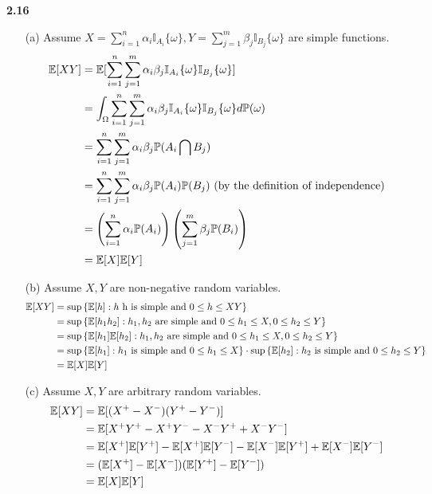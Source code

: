 \noindent\textbf{2.16}
\begin{enumerate}
\item[(a)] Assume $X=\sum^n_{i=1}\alpha_i\mathbb{I}_{A_i}\{\omega \},Y=\sum^m_{j=1}\beta_j\mathbb{I}_{B_j}\{\omega \}$ are simple functions.
    \begin{align}
        \mathbb{E}[XY]&=\mathbb{E}[\sum^n_{i=1}\sum^m_{j=1}\alpha_i\beta_j\mathbb{I}_{A_i}\{\omega \}\mathbb{I}_{B_j}\{\omega \}]\notag\\
        &=\int_{\Omega}\sum^n_{i=1}\sum^m_{j=1}\alpha_i\beta_j\mathbb{I}_{A_i}\{\omega \}\mathbb{I}_{B_j}\{\omega \}d\mathbb{P}(\omega)\notag\\
        &=\sum^n_{i=1}\sum^m_{j=1}\alpha_i\beta_j\mathbb{P}(A_i\bigcap B_j)\notag\\
        &=\sum^n_{i=1}\sum^m_{j=1}\alpha_i\beta_j\mathbb{P}(A_i)\mathbb{P}(B_j)\ (\text{by the definition of independence})\notag\\
        &=\left(\sum^n_{i=1}\alpha_i\mathbb{P}(A_i) \right)\left(\sum^m_{j=1}\beta_j\mathbb{P}(B_i)  \right)\notag\\
        &=\mathbb{E}[X]\mathbb{E}[Y]\notag
    \end{align}
\item[(b)] Assume $X,Y$ are non-negative random variables.
    \begin{align}
        \mathbb{E}[XY]&=\sup\left\{\mathbb{E}[h]:h\ \text{h is simple and}\ 0\leq h\leq XY\right\}\notag\\
        &=\sup\left\{\mathbb{E}[h_1h_2]:h_1,h_2\ \text{are simple and}\ 0\leq h_1\leq X,0\leq h_2\leq Y \right\}\notag\\
        &=\sup\left\{\mathbb{E}[h_1]\mathbb{E}[h_2]:h_1,h_2\ \text{are simple and}\ 0\leq h_1\leq X,0\leq h_2\leq Y \right\}\notag\\
        &=\sup\left\{\mathbb{E}[h_1]:h_1\ \text{is simple and}\ 0\leq h_1\leq X \right\}\cdot
        \sup\left\{\mathbb{E}[h_2]:h_2\ \text{is simple and}\ 0\leq h_2\leq Y \right\}\notag\\
        &=\mathbb{E}[X]\mathbb{E}[Y]\notag
    \end{align}
\item[(c)] Assume $X,Y$ are arbitrary random variables.
    \begin{align}
        \mathbb{E}[XY]&=\mathbb{E}[(X^+-X^-)(Y^+-Y^-)]\notag\\
        &=\mathbb{E}[X^+Y^+-X^+Y^--X^-Y^++X^-Y^-]\notag\\
        &=\mathbb{E}[X^+]\mathbb{E}[Y^+]-\mathbb{E}[X^+]\mathbb{E}[Y^-]-\mathbb{E}[X^-]\mathbb{E}[Y^+]+\mathbb{E}[X^-]\mathbb{E}[Y^-]\notag\\
        &=(\mathbb{E}[X^+]-\mathbb{E}[X^-])(\mathbb{E}[Y^+]-\mathbb{E}[Y^-])\notag\\
        &=\mathbb{E}[X]\mathbb{E}[Y]\notag
    \end{align}
\end{enumerate}

